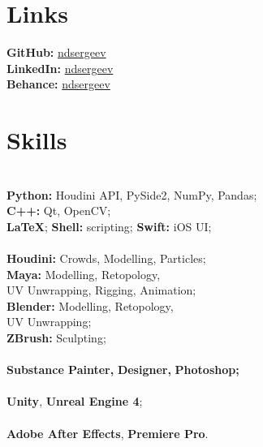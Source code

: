 \documentclass[]{cv-class}
\begin{document}
\begin{minipage}[t]{0.35\textwidth}
\section{Links}
\textcolor{subsec_col}{\textbf{GitHub:}} \href{https://github.com/ndsergeev}{ndsergeev} \\
\textcolor{subsec_col}{\textbf{LinkedIn:}} \href{https://www.linkedin.com/in/ndsergeev/}{ndsergeev} \\
\textcolor{subsec_col}{\textbf{Behance:}} \href{https://www.behance.net/ndsergeev}{ndsergeev}

\smallSeparator{0.4pt}
\section{Skills}
{} \\
\textbf{Python:} Houdini API, PySide2, NumPy, Pandas; \\
\textbf{C++:} Qt, OpenCV; \\ 
\textbf{\LaTeX};
\textbf{Shell:} scripting;
\textbf{Swift:} iOS UI; \\

{} \\
\textbf{Houdini:} Crowds, Modelling, Particles; \\
\textbf{Maya:} Modelling, Retopology, \\UV Unwrapping, Rigging, Animation; \\
\textbf{Blender:} Modelling, Retopology, \\UV Unwrapping; \\
\textbf{ZBrush:} Sculpting; \\

{} \\
\textbf{Substance Painter,}
\textbf{Designer,}
\textbf{Photoshop;} \\

{} \\
\textbf{Unity},
\textbf{Unreal Engine 4}; \\

{} \\
\textbf{Adobe After Effects},
\textbf{Premiere Pro}.

\smallSeparator{0.4pt}

\end{minipage}
\end{document}

